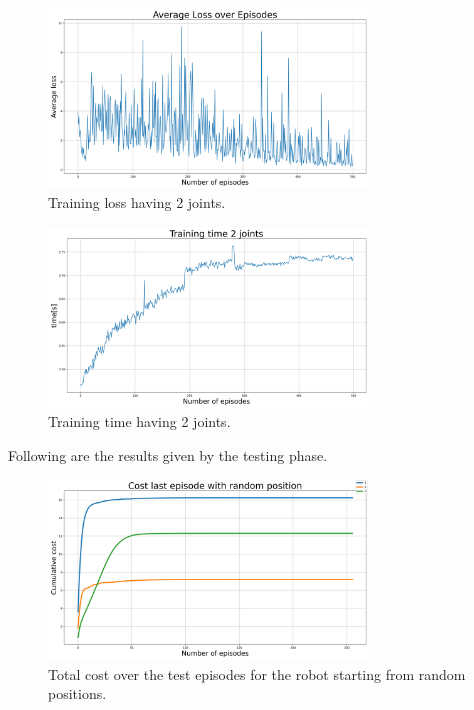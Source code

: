\documentclass[twocolumn, a4paper]{article}
\begin{document}
\label{fig:TrainLoss2}
\begin{figure}[H]
	\centering
	\includegraphics[width=8.5cm]{"../Figures/average_loss_over_epiodes_2J_500E_256EL.png"}
	\caption{Training loss having 2 joints.}
\end{figure}
\vspace{-0.5cm}
\label{fig:TrainTime2}
\begin{figure}[H]
	\centering
	\includegraphics[width=8.5cm]{"../Figures/training_time_over_epiodes_2J_500E_256EL.png"}
	\caption{Training time having 2 joints.}
\end{figure}
\vspace{-0.5cm}
Following are the results given by the testing phase.
\label{fig:Test_2_random_pos}
\begin{figure}[H]
	\centering
	\includegraphics[width=8.5cm]{"../Figures/loss_last_ep_random_positions_2J_500E_256EL.png"}
	\caption{Total cost over the test episodes for the robot starting
			 from random positions.}
\end{figure}
\vspace{-0.5cm}
\label{fig:Test_2_down_pos}
\end{document}

